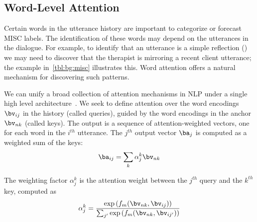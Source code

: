 \subsection{Word-Level Attention}
\label{ssec:word_att}

Certain words in the utterance history are important to categorize or
forecast MISC labels. The identification of these words may depend on
the utterances in the dialogue. For example, to identify that an
utterance is a simple reflection (\RES) we may need to discover that
the therapist is mirroring a recent client utterance; the example
in~\autoref{tbl:bg:misc} illustrates this. Word attention offers a
natural mechanism for discovering such patterns.


We can unify a broad collection of attention mechanisms in NLP under
a single high level architecture~\cite{galassi2019attention}. We
seek to define attention over the word encodings $\bv_{ij}$ in the
history (called queries), guided by the word encodings in the anchor
$\bv_{nk}$ (called keys). The output is a sequence of
attention-weighted vectors, one for each word in the $i^{th}$
utterance.  The $j^{th}$ output vector $\ba_j$ is computed as a
weighted sum of the keys:
\begin{equation}
  \ba_{ij} = \sum_{k} \alpha^{k}_{j} \bv_{nk}
\label{eq:att_sum}
\end{equation}

The weighting factor $\alpha^k_j$ is the attention weight between
the $j^{th}$ query and the $k^{th}$ key, computed as
\begin{equation}
\label{eq:att_weight}
\alpha^{k}_{j} = \frac{\exp\left(f_{m}(\bv_{nk}, \bv_{ij})\right)}{\sum_{j^{\prime}} \exp\left(f_{m}(\bv_{nk}, \bv_{ij^\prime})\right)}
\end{equation}

